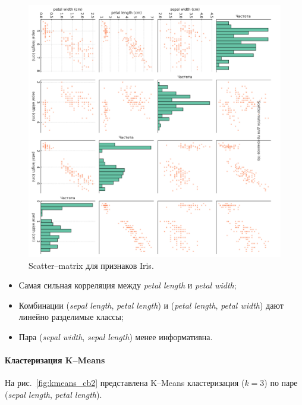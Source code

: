 \begin{figure}[H]
  \centering
  \includegraphics[width=\textwidth]{images/scatter_matrix_cb2.png}
  \caption{Scatter–matrix для признаков Iris.}
  \label{fig:scatter_matrix}
\end{figure}

\begin{itemize}
  \item Самая сильная корреляция между \emph{petal length} и \emph{petal width};
  \item Комбинации (\emph{sepal length}, \emph{petal length}) и (\emph{petal length}, \emph{petal width}) дают линейно разделимые классы;
  \item Пара (\emph{sepal width}, \emph{sepal length}) менее информативна.
\end{itemize}

\paragraph{Кластеризация K–Means}

На рис.~\ref{fig:kmeans_cb2} представлена K–Means кластеризация ($k=3$) по паре (\emph{sepal length}, \emph{petal length}).

